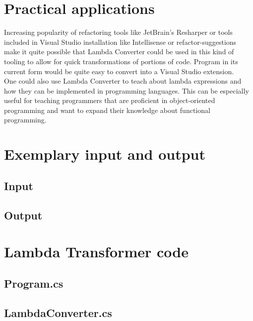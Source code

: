 \documentclass[]{report}
\begin{document}
    \section{Practical applications}
    Increasing popularity of refactoring tools like JetBrain's Resharper or tools included in Visual Studio installation like Intellisense or refactor-suggestions make it quite possible that Lambda Converter could be used in this kind of tooling to allow for quick transformations of portions of code. Program in its current form would be quite easy to convert into a Visual Studio extension.
    \\
    One could also use Lambda Converter to teach about lambda expressions and how they can be implemented in programming languages. This can be especially useful for teaching programmers that are proficient in object-oriented programming and want to expand their knowledge about functional  programming.


\section {Exemplary input and output}
    \subsection{Input}\label{testsInput}
    
    \pagebreak
    \subsection{Output}\label{testsOutput}
     
    \pagebreak
    \section{Lambda Transformer code}

   \subsection{Program.cs}
    
    \pagebreak
    
    \subsection{LambdaConverter.cs}
    
    \pagebreak
    
\end{document}

